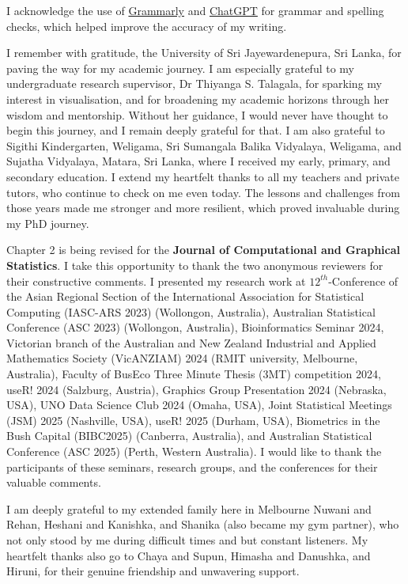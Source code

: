 \documentclass[
  11pt,
  a4paper,
]{report}
\begin{document}
I acknowledge the use of \href{https://app.grammarly.com/}{Grammarly}
and \href{https://chatgpt.com/}{ChatGPT} for grammar and spelling
checks, which helped improve the accuracy of my writing.

I remember with gratitude, the University of Sri Jayewardenepura, Sri
Lanka, for paving the way for my academic journey. I am especially
grateful to my undergraduate research supervisor, Dr Thiyanga S.
Talagala, for sparking my interest in visualisation, and for broadening
my academic horizons through her wisdom and mentorship. Without her
guidance, I would never have thought to begin this journey, and I remain
deeply grateful for that. I am also grateful to Sigithi Kindergarten,
Weligama, Sri Sumangala Balika Vidyalaya, Weligama, and Sujatha
Vidyalaya, Matara, Sri Lanka, where I received my early, primary, and
secondary education. I extend my heartfelt thanks to all my teachers and
private tutors, who continue to check on me even today. The lessons and
challenges from those years made me stronger and more resilient, which
proved invaluable during my PhD journey.

Chapter 2 is being revised for the \textbf{Journal of Computational and
Graphical Statistics}. I take this opportunity to thank the two
anonymous reviewers for their constructive comments. I presented my
research work at \(12^{th}\)-Conference of the Asian Regional Section of
the International Association for Statistical Computing (IASC-ARS 2023)
(Wollongon, Australia), Australian Statistical Conference (ASC 2023)
(Wollongon, Australia), Bioinformatics Seminar 2024, Victorian branch of
the Australian and New Zealand Industrial and Applied Mathematics
Society (VicANZIAM) 2024 (RMIT university, Melbourne, Australia),
Faculty of BusEco Three Minute Thesis (3MT) competition 2024, useR! 2024
(Salzburg, Austria), Graphics Group Presentation 2024 (Nebraska, USA),
UNO Data Science Club 2024 (Omaha, USA), Joint Statistical Meetings
(JSM) 2025 (Nashville, USA), useR! 2025 (Durham, USA), Biometrics in the
Bush Capital (BIBC2025) (Canberra, Australia), and Australian
Statistical Conference (ASC 2025) (Perth, Western Australia). I would
like to thank the participants of these seminars, research groups, and
the conferences for their valuable comments.

I am deeply grateful to my extended family here in Melbourne Nuwani and
Rehan, Heshani and Kanishka, and Shanika (also became my gym partner),
who not only stood by me during difficult times and but constant
listeners. My heartfelt thanks also go to Chaya and Supun, Himasha and
Danushka, and Hiruni, for their genuine friendship and unwavering
support.
\end{document}
